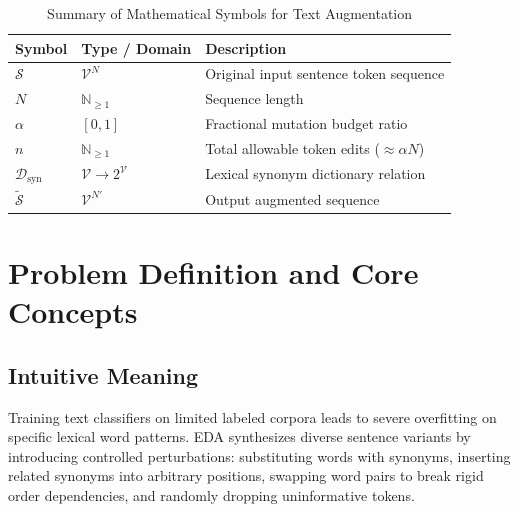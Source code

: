 \documentclass[11pt,a4paper]{article}
\theoremstyle{definition}
\begin{document}
\begin{table}[h]
\centering
\caption{Summary of Mathematical Symbols for Text Augmentation}
\begin{tabular}{lll}
\toprule
\textbf{Symbol} & \textbf{Type / Domain} & \textbf{Description} \\
\midrule
$\mathcal{S}$ & $\mathcal{V}^N$ & Original input sentence token sequence \\
$N$ & $\mathbb{N}_{\ge 1}$ & Sequence length \\
$\alpha$ & $[0, 1]$ & Fractional mutation budget ratio \\
$n$ & $\mathbb{N}_{\ge 1}$ & Total allowable token edits ($\approx \alpha N$) \\
$\mathcal{D}_{\text{syn}}$ & $\mathcal{V} \to 2^{\mathcal{V}}$ & Lexical synonym dictionary relation \\
$\tilde{\mathcal{S}}$ & $\mathcal{V}^{N'}$ & Output augmented sequence \\
\bottomrule
\end{tabular}
\end{table}

\section{Problem Definition and Core Concepts}

\subsection{Intuitive Meaning}
Training text classifiers on limited labeled corpora leads to severe overfitting on specific lexical word patterns. EDA synthesizes diverse sentence variants by introducing controlled perturbations: substituting words with synonyms, inserting related synonyms into arbitrary positions, swapping word pairs to break rigid order dependencies, and randomly dropping uninformative tokens.
\end{document}
